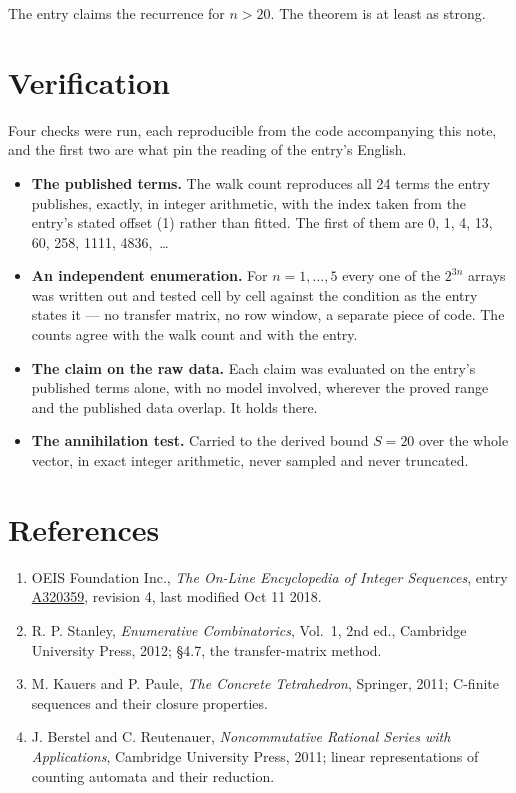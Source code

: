 \documentclass[11pt]{article}
\theoremstyle{definition}
\begin{document}
The entry claims the recurrence for $n > 20$. The theorem is at least as strong.

\section{Verification}

Four checks were run, each reproducible from the code accompanying this note, and the first two are what pin the reading of the entry's English.

\begin{itemize}

\item {\bfseries The published terms.} The walk count reproduces all 24 terms the entry publishes, exactly, in integer arithmetic, with the index taken from the entry's stated offset (1) rather than fitted. The first of them are 0, 1, 4, 13, 60, 258, 1111, 4836,~\dots

\item {\bfseries An independent enumeration.} For $n = 1,\dots,5$ every one of the $2^{3n}$ arrays was written out and tested cell by cell against the condition as the entry states it --- no transfer matrix, no row window, a separate piece of code. The counts agree with the walk count and with the entry.

\item {\bfseries The claim on the raw data.} Each claim was evaluated on the entry's published terms alone, with no model involved, wherever the proved range and the published data overlap. It holds there.

\item {\bfseries The annihilation test.} Carried to the derived bound $S = 20$ over the whole vector, in exact integer arithmetic, never sampled and never truncated.

\end{itemize}

\section{References}

\begin{enumerate}

\item OEIS Foundation Inc., \emph{The On-Line Encyclopedia of Integer Sequences}, entry \href{https://oeis.org/A320359}{A320359}, revision 4, last modified Oct 11 2018.

\item R. P. Stanley, \emph{Enumerative Combinatorics}, Vol.~1, 2nd ed., Cambridge University Press, 2012; \S4.7, the transfer-matrix method.

\item M. Kauers and P. Paule, \emph{The Concrete Tetrahedron}, Springer, 2011; C-finite sequences and their closure properties.

\item J. Berstel and C. Reutenauer, \emph{Noncommutative Rational Series with Applications}, Cambridge University Press, 2011; linear representations of counting automata and their reduction.

\end{enumerate}
\end{document}
